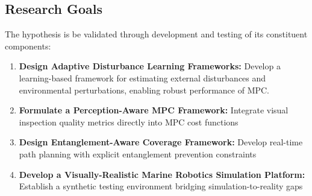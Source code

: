\subsection{Research Goals}
The hypothesis is  be validated through development and testing of its constituent components:



\begin{enumerate}
\item \textbf{Design Adaptive Disturbance Learning Frameworks:}  
Develop a learning-based framework for estimating external disturbances and environmental perturbations, enabling robust performance of MPC.


\item \textbf{Formulate a Perception-Aware \ac{MPC} Framework:}  
Integrate visual inspection quality metrics directly into MPC cost functions

\item \textbf{Design Entanglement-Aware Coverage Framework:}  
Develop real-time path planning with explicit entanglement prevention constraints

\item \textbf{Develop a Visually-Realistic Marine Robotics Simulation Platform:}  
Establish a synthetic testing environment bridging simulation-to-reality gaps
\end{enumerate}


